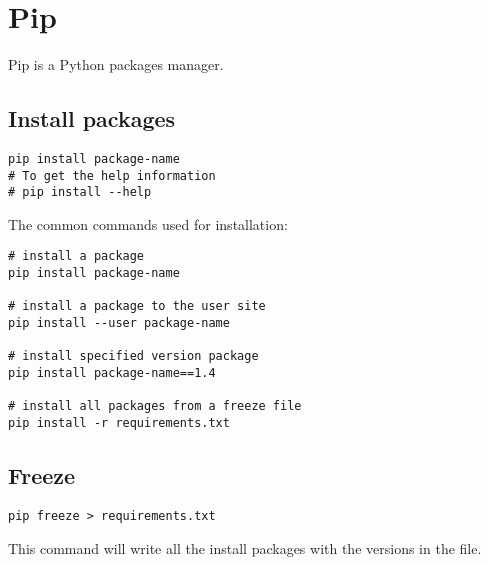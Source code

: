 
\chapter{Pip}
\label{cha:pip}

Pip is a Python packages manager.

\section{Install packages}
\label{sec:install-packages}

\begin{lstlisting}
pip install package-name
# To get the help information
# pip install --help
\end{lstlisting}


The common commands used for installation:
\begin{lstlisting}
# install a package
pip install package-name

# install a package to the user site
pip install --user package-name

# install specified version package
pip install package-name==1.4

# install all packages from a freeze file
pip install -r requirements.txt
\end{lstlisting}

\section{Freeze}
\label{sec:freeze}

\begin{lstlisting}
pip freeze > requirements.txt
\end{lstlisting}

This command will write all the install packages with the versions in the  file.



